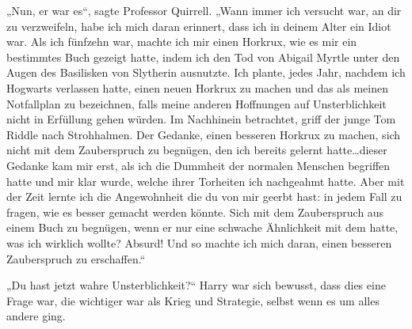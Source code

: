 „Nun, er war es“, sagte Professor Quirrell. „Wann immer ich versucht war, an dir zu verzweifeln, habe ich mich daran erinnert, dass ich in deinem Alter ein Idiot war. Als ich fünfzehn war, machte ich mir einen Horkrux, wie es mir ein bestimmtes Buch gezeigt hatte, indem ich den Tod von Abigail Myrtle unter den Augen des Basilisken von Slytherin ausnutzte. Ich plante, jedes Jahr, nachdem ich Hogwarts verlassen hatte, einen neuen Horkrux zu machen und das als meinen Notfallplan zu bezeichnen, falls meine anderen Hoffnungen auf Unsterblichkeit nicht in Erfüllung gehen würden. Im Nachhinein betrachtet, griff der junge Tom Riddle nach Strohhalmen. Der Gedanke, einen besseren Horkrux zu machen, sich nicht mit dem Zauberspruch zu begnügen, den ich bereits gelernt hatte…dieser Gedanke kam mir erst, als ich die Dummheit der normalen Menschen begriffen hatte und mir klar wurde, welche ihrer Torheiten ich nachgeahmt hatte. Aber mit der Zeit lernte ich die Angewohnheit die du von mir geerbt hast: in jedem Fall zu fragen, wie es besser gemacht werden könnte. Sich mit dem Zauberspruch aus einem Buch zu begnügen, wenn er nur eine schwache Ähnlichkeit mit dem hatte, was ich wirklich wollte? Absurd! Und so machte ich mich daran, einen besseren Zauberspruch zu erschaffen.“

„Du hast jetzt wahre Unsterblichkeit?“
Harry war sich bewusst, dass dies eine Frage war, die wichtiger war als Krieg und Strategie, selbst wenn es um alles andere ging.

